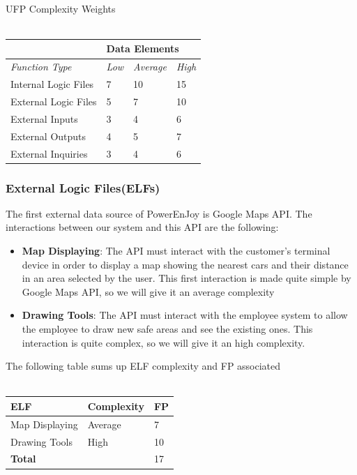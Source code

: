 \documentclass{article}
\begin{document}
\\\\\\
UFP Complexity Weights
\\\\
\begin{tabular}{|p{3cm}|p{1cm}|p{1cm}|p{1cm}|}
\hline
& \multicolumn{3}{l|}{Data Elements}\\
\hline
\textit{Function Type} & \textit{Low} & \textit{Average} & \textit{High} \\
\hline
Internal Logic Files & 7 & 10 & 15\\
\hline
External Logic Files & 5 & 7 & 10\\
\hline
External Inputs & 3 & 4 & 6\\
\hline
External Outputs & 4 & 5 & 7\\
\hline
External Inquiries & 3 & 4 & 6\\
\hline
\end{tabular}


\subsubsection{External Logic Files(ELFs)}
The first external data source of PowerEnJoy is Google Maps API. The interactions between our system and this API are the following:
\begin{itemize}[noitemsep]
\item \textbf{Map Displaying}: The API must interact with the customer's terminal device in order to display a map showing the nearest cars and their distance in an area selected by the user. This first interaction is made quite simple by Google Maps API, so we will give it an average complexity
\item \textbf {Drawing Tools}: The API must interact with the employee system to allow the employee to draw new safe areas and see the existing ones. This interaction is quite complex, so we will give it an high complexity.
\end{itemize}
The following table sums up ELF complexity and FP associated\\\\
\begin{tabular}{|p{5cm}|p{3cm}|p{2cm}|}
\hline
\textbf{ELF} & \textbf{Complexity} & \textbf{FP} \\
\hline

Map Displaying & Average & 7\\
Drawing Tools & High & 10\\
\hline
\multicolumn{2}{|l|}{\textbf{Total}} & 17\\
\hline
\end{tabular}
\end{document}
